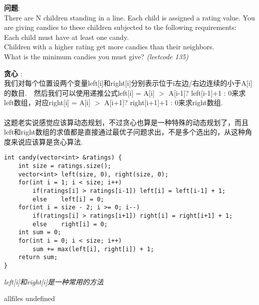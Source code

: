 \documentclass{article}
\begin{document}
\begin{CJK}{UTF8}{gbsn}     %

\else
    
\begin{description}
    \item{\textbf{问题}}:\\
There are N children standing in a line. Each child is assigned a rating value.
You are giving candies to these children subjected to the following requirements:\\
Each child must have at least one candy.\\
Children with a higher rating get more candies than their neighbors.\\
What is the minimum candies you must give? \textit{(leetcode 135)}
    \item{\textbf{贪心}} : 
	\\我们对每个位置设两个变量left[i]和right[i]分别表示位于i左边/右边连续的小于A[i]的数目.　然后我们可以使用递推公式left[i] = A[i] $>$ A[i-1]?  left[i-1]+1 : 0来求left数组，对应right[i] = A[i] $>$ A[i+1]? right[i+1]+1 : 0来求right数组.\\
    \\这题老实说感觉应该算动态规划，不过贪心也算是一种特殊的动态规划了，而且left和right数组的求值都是直接通过最优子问题求出，不是多个选出的，从这种角度来说应该算是贪心算法.
    \begin{lstlisting}
int candy(vector<int> &ratings) {
	int size = ratings.size();
	vector<int> left(size, 0), right(size, 0);
	for(int i = 1; i < size; i++)
		if(ratings[i] > ratings[i-1]) left[i] = left[i-1] + 1;
		else	left[i] = 0;
	for(int i = size - 2; i >= 0; i--)
		if(ratings[i] > ratings[i+1]) right[i] = right[i+1] + 1;
		else	right[i] = 0;
	int sum = 0;
	for(int i = 0; i < size; i++)
		sum += max(left[i], right[i]) + 1;
	return sum;
}
    \end{lstlisting}
    \textit{left[i]和right[i]是一种常用的方法}
\end{description}

\fi

\ifx allfiles undefined
\end{CJK}
\end{document}
